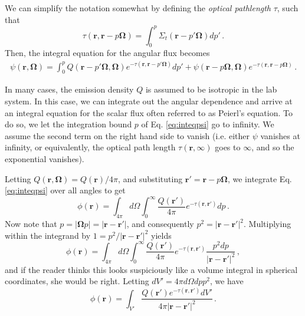 We can simplify the notation somewhat by defining the \textit{optical pathlength} $\tau$, such that
\begin{equation}
  \tau ( \mathbf{r} ,\mathbf{r} -p \mathbf{\Omega} ) = \int^p_0 \Sigma_t(\mathbf{r} -p'\mathbf{\Omega}) dp' \, . 
  \label{eq:opticalpathlength}
\end{equation}
Then, the integral equation for the angular flux becomes
\begin{equation}
  \begin{split}
    \psi(\mathbf{r},\mathbf{\Omega}) = \int^p_0 Q(\mathbf{r} -p'\mathbf{\Omega},\mathbf{\Omega})e^{-\tau(\mathbf{r},\mathbf{r}-p'\mathbf{\Omega})}dp'                         +  \psi(\mathbf{r} - p\mathbf{\Omega},\mathbf{\Omega})e^{ -\tau(\mathbf{r},\mathbf{r}-p\mathbf{\Omega}) }   \, .
  \end{split}
  \label{eq:inteqpsi}
\end{equation}

In many cases, the emission density $Q$ is assumed to be isotropic in the lab system.  In this case, we can integrate out the angular dependence and arrive at an integral equation for the scalar flux often referred to as Peierl's equation.  To do so, we let the integration bound $p$ of Eq. \ref{eq:inteqpsi} go to infinity.  We assume the second term on the right hand side to vanish (i.e. either $\psi$ vanishes at infinity, or equivalently, the optical path length $\tau(\mathbf{r},\infty)$ goes to $\infty$, and so the exponential vanishes).  

Letting $Q(\mathbf{r},\mathbf{\Omega}) = Q(\mathbf{r})/4\pi$, and substituting $\mathbf{r}' = \mathbf{r} - p \mathbf{\Omega}$, we integrate Eq. \ref{eq:inteqpsi} over all angles to get
\begin{equation}
 \phi(\mathbf{r}) = \int_{4\pi} d\Omega \int^{\infty}_0  \frac{Q(\mathbf{r}')}{4\pi}e^{-\tau(\mathbf{r},\mathbf{r}')}dp \, .
 \label{eq:integralphiPRE}
\end{equation}
Now note that $p =|\mathbf{\Omega} p|=|\mathbf{r}-\mathbf{r}'|$, and consequently $p^2 = |\mathbf{r}-\mathbf{r}'|^2$.  Multiplying within the integrand by $1=p^2/|\mathbf{r}-\mathbf{r}'|^2$ yields
\begin{equation}
 \phi(\mathbf{r}) = \int_{4\pi} d\Omega \int^{\infty}_0  \frac{Q(\mathbf{r}')}{4\pi}e^{-\tau(\mathbf{r},\mathbf{r}')}\frac{p^2dp}{|\mathbf{r}-\mathbf{r}'|^2} \, ,
\end{equation}
and if the reader thinks this looks suspiciously like a volume integral in spherical coordinates, she would be right.  Letting $dV' = 4\pi d\Omega dpp^2$, we have
\begin{equation}
 \phi(\mathbf{r}) = \int_{V'} \frac{ Q(\mathbf{r}')e^{-\tau(\mathbf{r},\mathbf{r}')} dV'}{4\pi|\mathbf{r}-\mathbf{r}'|^2} \, .
 \label{eq:integralphi}
\end{equation}

